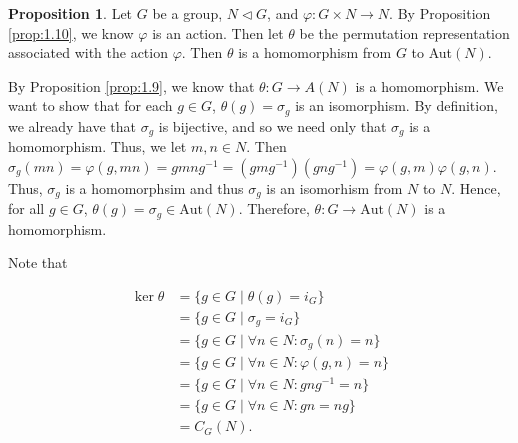 \documentclass{article}
\makeatletter
\theoremstyle{definition}
\newtheorem{prop}{Proposition}[section]
\theoremstyle{remark}
\let\oldproofname=\proofname
\renewcommand{\proofname}{\bf{\textit{\oldproofname}}}
\theoremstyle{definition}
\renewenvironment{proof}[1][\proofname]{\par
  \pushQED{\qed}%
  \normalfont \topsep6\p@\@plus6\p@\relax
  \list{}{\leftmargin=0mm
          \rightmargin=0mm
          \settowidth{\itemindent}{\itshape#1}%
          \labelwidth=4mm
          \parsep=0pt \listparindent=0mm%
  }
  \item[\hskip\labelsep
        \itshape
    #1\@addpunct{.}]\ignorespaces
}{%
  \popQED\endlist\@endpefalse
}
\makeatother
\begin{document}
    \begin{prop}\label{prop:1.11}
        Let $G$ be a group, $N\triangleleft G$, and $\varphi\colon G\times N\rightarrow N$. By Proposition \ref{prop:1.10}, we know $\varphi$ is an action. Then let $\theta$ be the permutation representation associated with the action $\varphi$. Then $\theta$ is a homomorphism from $G$ to Aut$(N)$. 
    \end{prop}
        \begin{proof}
            By Proposition \ref{prop:1.9}, we know that $\theta\colon G\rightarrow A(N)$ is a homomorphism. We want to show that for each $g\in G$, $\theta(g)=\sigma_g$ is an isomorphism. By definition, we already have that $\sigma_g$ is bijective, and so we need only that $\sigma_g$ is a homomorphism. Thus, we let $m,n\in N$. Then $\sigma_g(mn)=\varphi(g,mn)=gmng^{-1}=(gmg^{-1})(gng^{-1})=\varphi(g,m)\varphi(g,n)$. Thus, $\sigma_g$ is a homomorphsim and thus $\sigma_g$ is an isomorhism from $N$ to $N$. Hence, for all $g\in G$,  $\theta(g)=\sigma_g\in\text{Aut}(N)$. Therefore, $\theta\colon G\rightarrow\text{Aut}(N)$ is a homomorphism.
        \end{proof}
        
    Note that 
    
    \begin{equation*}
        \begin{split}
            \ker\theta &= \{g\in G\mid \theta(g)= i_G\} \\
            &=\{g\in G\mid \sigma_g=i_G\} \\
            &=\{g\in G\mid \forall n\in N\colon \sigma_g(n)=n\} \\
            &= \{g\in G\mid \forall n\in N\colon \varphi(g,n)=n\} \\
            &= \{g\in G\mid\forall n\in N\colon gng^{-1}=n\} \\
            &= \{g\in G\mid \forall n\in N\colon gn=ng\} \\
            &= C_G(N).
        \end{split}
    \end{equation*}
        
\end{document}
